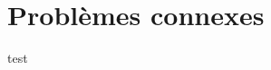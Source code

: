 \documentclass[11pt,a4paper]{article}
\begin{document}
  \section{Problèmes connexes}





  

  \begin{plusloin}{}
    test
  \end{plusloin}

  
  
\end{document}
